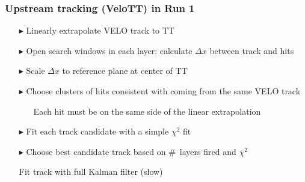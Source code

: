 \documentclass[aspectratio=1610]{beamer}
\begin{document}
\begin{frame}\frametitle{Upstream tracking (VeloTT) in Run 1}
  \begin{itemize}
  \item[$\blacktriangleright$] Linearly extrapolate VELO track to TT
  \item[$\blacktriangleright$] Open search windows in each layer: calculate $\Delta x$ between track and hits
  \item[$\blacktriangleright$] Scale $\Delta x$ to reference plane at center of TT
  \item[$\blacktriangleright$] Choose clusters of hits consistent with coming from the same VELO track
  \begin{itemize}
    \item[\ding{80}] Each hit must be on the same side of the linear extrapolation
  \end{itemize}
  \item[$\blacktriangleright$] Fit each track candidate with a simple $\chi^{2}$ fit
  \item[$\blacktriangleright$] Choose best candidate track based on \mbox{\# layers} fired and $\chi^{2}$
  \item[\ding{80}] Fit track with full Kalman filter (slow)
  \end{itemize}
  
\end{frame}
\end{document}
